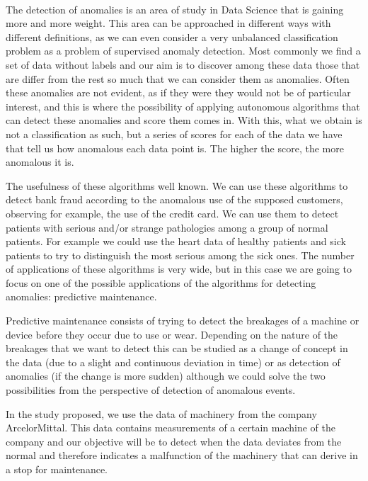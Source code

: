 \vspace{0.7cm}
\\

The detection of anomalies is an area of study in Data Science that is gaining more and more weight. This area can be approached in different ways with different definitions, as we can even consider a very unbalanced classification problem as a problem of supervised anomaly detection. Most commonly we find a set of data without labels and our aim is to discover among these data those that are differ from the rest so much that we can consider them as anomalies. Often these anomalies are not evident, as if they were they would not be of particular interest, and this is where the possibility of applying autonomous algorithms that can detect these anomalies and score them comes in. With this, what we obtain is not a classification as such, but a series of scores for each of the data we have that tell us how anomalous each data point is. The higher the score, the more anomalous it is.

The usefulness of these algorithms well known. We can use these algorithms to detect bank fraud according to the anomalous use of the supposed customers, observing for example, the use of the credit card. We can use them to detect patients with serious and/or strange pathologies among a group of normal patients. For example we could use the heart data of healthy patients and sick patients to try to distinguish the most serious among the sick ones. The number of applications of these algorithms is very wide, but in this case we are going to focus on one of the possible applications of the algorithms for detecting anomalies: predictive maintenance.

Predictive maintenance consists of trying to detect the breakages of a machine or device before they occur due to use or wear. Depending on the nature of the breakages that we want to detect this can be studied as a change of concept in the data (due to a slight and continuous deviation in time) or as detection of anomalies (if the change is more sudden) although we could solve the two possibilities from the perspective of detection of anomalous events.

In the study proposed, we use the data of machinery from the company ArcelorMittal. This data contains measurements of a certain machine of the company and our objective will be to detect when the data deviates from the normal and therefore indicates a malfunction of the machinery that can derive in a stop for maintenance. 

